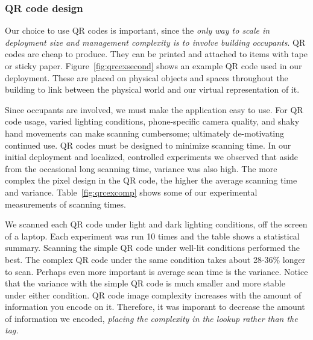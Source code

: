 \subsubsection{QR code design}
\label{sec:qrc}
Our choice to use QR codes is important, since the \emph{only way to scale in deployment size and management complexity is to
involve building occupants}. QR codes are cheap to produce.  They can be printed and attached to items with tape or sticky paper.  
Figure~\ref{fig:qrcexsecond} shows an example QR code used in our deployment.  These are placed on physical
objects and spaces throughout the building to link between the physical world and our virtual representation of it.


Since occupants are involved, we must make the application easy to use.  For QR code usage, varied lighting conditions, 
phone-specific camera quality, and shaky hand movements can make scanning cumbersome; ultimately de-motivating continued use.  
QR codes must be designed to minimize scanning time.  In our initial deployment and localized, controlled experiments we observed 
that aside from the occasional long scanning time, variance was also high.  The more complex the pixel design in the QR code, the 
higher the average scanning time and variance.  Table~\ref{fig:qrcexcomp} shows some of our experimental measurements of scanning 
times.


We scanned each QR code under light and dark lighting conditions, off the screen of a laptop.  Each experiment was run 10 times and 
the table shows a statistical summary.  Scanning the simple QR code under well-lit conditions performed the best.  The complex QR code under 
the same condition takes about 28-36\% longer to scan.
Perhaps even more important is average scan time is the variance.  Notice that the variance with the simple QR code is much smaller and
more stable under either condition.
QR code image complexity increases with the amount of information you encode on it.  Therefore, it was imporant to decrease the
amount of information we encoded, \emph{placing the complexity in the lookup rather than the tag.}

